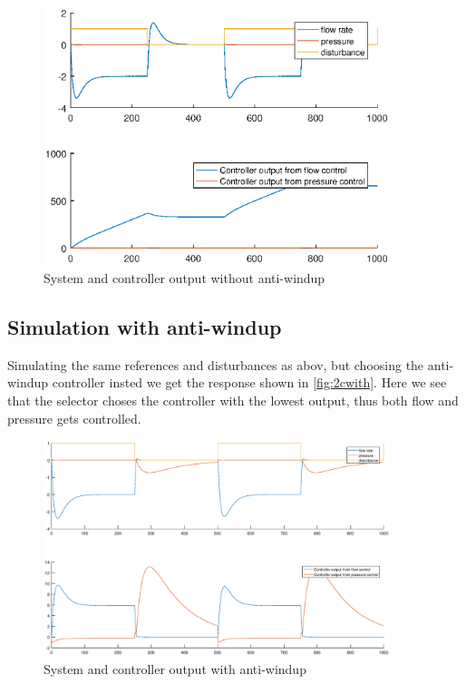 \documentclass[a4paper]{scrartcl}
\begin{document}
\begin{figure}[ht!]
	\centering
	\includegraphics[width=0.9\textwidth]{fig/task2/2c_without_antiwindup.eps}
	\caption{System and controller output without anti-windup}
	\label{fig:2cwithout}
\end{figure}

\subsection{Simulation with anti-windup}

Simulating the same references and disturbances as abov, but choosing the anti-windup controller insted we get the response shown in \autoref{fig:2cwith}. Here we see that the selector choses the controller with the lowest output, thus both flow and pressure gets controlled.

\begin{figure}[ht!]
	\centering
	\includegraphics[width=0.9\textwidth]{fig/task2/2c_with_antiwindup_new.eps}
	\caption{System and controller output with anti-windup}
	\label{fig:2cwith}
\end{figure}
\end{document}
